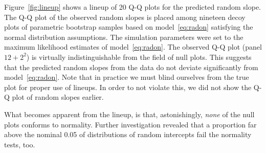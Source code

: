 \documentclass{article} %
\begin{document}
Figure~\ref{fig:lineup} shows a lineup \citep{buja:2009} of 20 Q-Q plots for the predicted random slope. The Q-Q plot of the observed random slopes is placed among nineteen decoy plots of parametric bootstrap samples based on model~\eqref{eq:radon} satisfying the normal distribution assumptions. The simulation parameters were set to the maximum likelihood estimates of model~\eqref{eq:radon}.
The observed Q-Q plot (panel $12+2^2$) is virtually indistinguishable from the field of null plots. This suggests that the predicted random slopes  from the data do not deviate significantly from model~\eqref{eq:radon}. 
Note that in practice we must blind ourselves from the true plot for proper use of lineups. In order to not violate this, we did not show the Q-Q plot of random slopes earlier.
%
%

What becomes apparent from the lineup, is that, astonishingly, {\it none} of the null plots conforms to normality. Further investigation  revealed  that a  proportion far above the nominal 0.05 of distributions of random intercepts  fail the normality tests, too.


\end{document}
